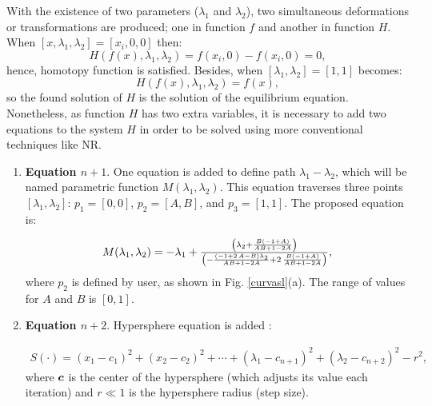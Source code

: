 \documentclass[conference,letterpaper,onecolumn]{IEEEtran}
\newcommand{\pig}[1]{\mbox{\boldmath ${#1}$}	}
\begin{document}
With the existence of two parameters ($\lambda_1$ and $\lambda_2$), two simultaneous deformations or transformations are produced; one in function $f$ and another in function $H$. When $[x,\lambda_1,\lambda_2]=[x_i,0,0]$ then:
\begin{equation}
{H}({f}({x}),\lambda_1,\lambda_2 ) = f(x_i,0)-f(x_i,0)=0, 
\label{hexamp1l1}
\end{equation}
hence, homotopy function is satisfied. Besides, when $[\lambda_1,\lambda_2]=[1,1]$ becomes:
\begin{equation}
{H}({f}({x}),\lambda_1,\lambda_2 ) = f(x),
\label{hexamp1l2}
\end{equation}
so the found solution of $H$ is the solution of the equilibrium equation. Nonetheless, as function $H$ has two extra variables, it is necessary to add two equations to the system $H$ in order to be solved using more conventional techniques like NR.

\begin{enumerate}
\item {\bf Equation $n+1$}. One equation is added to define path $\lambda_1-\lambda_2$, which will be named parametric function $M(\lambda_1,\lambda_2)$. This equation traverses three points $[\lambda_1,\lambda_2]$: $p_1=[0,0]$, $p_2=[A,B]$, and $p_3=[1,1]$. The proposed equation is:

{\large
\begin{equation}
\begin{array}{c}
M(\lambda_1,\lambda_2)= {\LARGE-\lambda_{{1}}+{ \left( \lambda_{{2}}+{\frac {B \left( - 1+A \right) }
{AB+ 1- 2A}} \right) \over  \left( -{\frac { \left( - 1+ 2\,
A- B \right) \lambda_{{2}}}{AB+ 1- 2A}}+ 2\,{\frac {B
 \left( - 1+A \right) }{AB+ 1- 2A}} \right) }},
\end{array}
\label{homotopiaPx4}
\end{equation}
}
where $p_2$ is defined by user, as shown in Fig. \ref{curvasl}(a). The range of values for $A$ and $B$ is $[0,1]$.

\item {\bf Equation $n+2$}. Hypersphere equation is added \cite{hiper}:

{
\begin{equation}
\begin{array}{c}
S(\cdot)=(x_1-c_1)^2+ (x_2-c_2)^2+ \cdots+ (\lambda_1-c_{n+1})^2+(\lambda_2-c_{n+2})^2-r^2,
\end{array}
\label{hiperesfera}
\end{equation}
}
where $\pig{c}$ is the center of the hypersphere (which adjusts its value each iteration) and $r\ll 1$ is the hypersphere radius (step size).
\end{enumerate}
\end{document}

